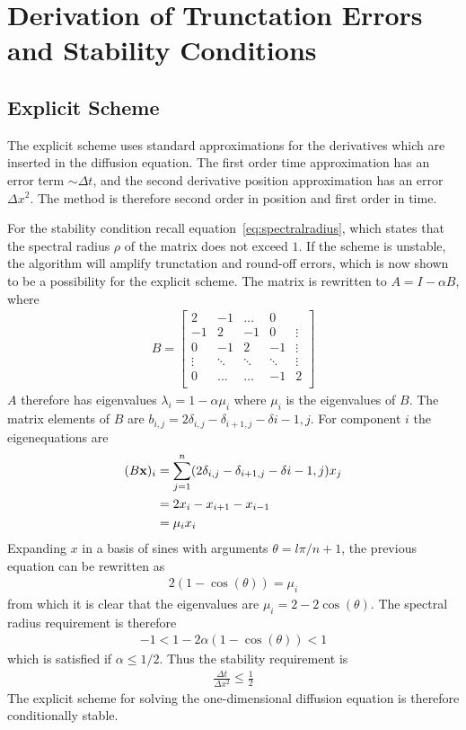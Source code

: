 \documentclass[aps,reprint]{revtex4-1}
\begin{document}
\section{Derivation of Trunctation Errors and Stability Conditions} \label{sec:errors}
\subsection{Explicit Scheme}
The explicit scheme uses standard approximations for the derivatives which are
inserted in the diffusion equation. The first order time approximation has
an error term $\sim \Delta{t}$, and the second derivative position approximation
has an error $\Delta{x^2}$. The method is therefore second order in position and
first order in time.

For the stability condition recall equation~\ref{eq:spectralradius}, which states
that the spectral radius $\rho$ of the matrix does not exceed $1$. If the scheme is
unstable, the algorithm will amplify trunctation and round-off errors, which is
now shown to be a possibility for the explicit scheme. The matrix
is rewritten to $A = I - \alpha B$, where
\begin{align*}
  B = \begin{bmatrix}
        2  & -1 & \hdots  & 0      \\
        -1 & 2  & -1 & 0       & \vdots \\
        0  & -1 & 2  & -1  & \vdots \\
        \vdots       & \ddots      & \ddots       & \ddots  & \vdots \\
        0  & \hdots  & \hdots       & -1  & 2 \\
      \end{bmatrix}
\end{align*}
$A$ therefore has eigenvalues $\lambda_i = 1 - \alpha \mu_i$ where $\mu_i$ is
the eigenvalues of $B$. The matrix elements of $B$ are $b_{i,j} = 2\delta_{i,j} - \delta_{i+1,j} - \delta{i-1,j}$.
For component $i$ the eigenequations are
\begin{align*}
  (B\vb{x})_i &= \sum_{j=1}^{n} (2\delta_{i,j} - \delta_{i+1,j} - \delta{i-1,j})x_j \\
              &= 2x_i - x_{i+1} - x_{i-1} \\
              &= \mu_i x_i
\end{align*}
Expanding $x$ in a basis of sines with arguments $\theta = l \pi / n + 1$, the previous equation can be rewritten as
\begin{align*}
  2(1 - \cos{(\theta)}) = \mu_i
\end{align*}
from which it is clear that the eigenvalues are $\mu_i = 2 - 2 \cos{(\theta)}$. The
spectral radius requirement is therefore
\begin{align*}
  -1 < 1 - 2 \alpha (1 - \cos{(\theta)}) < 1
\end{align*}
which is satisfied if $\alpha \leq 1/2$. Thus the stability requirement is
\begin{align}
  \frac{\Delta{t}}{\Delta{x^2}} \leq \frac{1}{2}
\end{align}
The explicit scheme for solving the one-dimensional diffusion equation is therefore
conditionally stable.
\end{document}
